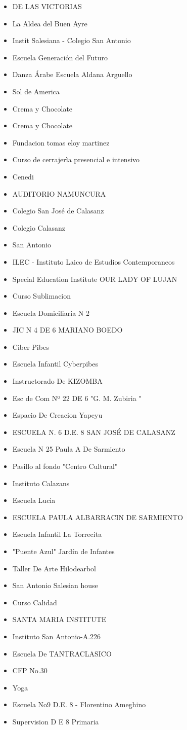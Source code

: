 \documentclass[a4paper, 10pt]{article}
\begin{document}
					\begin{itemize}
					\item DE LAS VICTORIAS
\item La Aldea del Buen Ayre
\item Instit Salesiana - Colegio San Antonio
\item Escuela Generación del Futuro
\item Danza Árabe Escuela Aldana Arguello
\item Sol de America
\item Crema y Chocolate
\item Crema y Chocolate
\item Fundacion tomas eloy martinez
\item Curso de cerrajerìa presencial e intensivo
\item Cenedi
\item AUDITORIO NAMUNCURA
\item Colegio San José de Calasanz
\item Colegio Calasanz
\item San Antonio
\item ILEC - Instituto Laico de Estudios Contemporaneos
\item Special Education Institute OUR LADY OF LUJAN
\item Curso Sublimacion
\item Escuela Domiciliaria N 2
\item JIC N 4 DE 6 MARIANO BOEDO
\item Ciber Pibes
\item Escuela Infantil Cyberpibes
\item Instructorado De KIZOMBA
\item Esc de Com Nº 22 DE 6 "G. M. Zubiria "
\item Espacio De Creacion Yapeyu
\item ESCUELA N. 6 D.E. 8 SAN JOSÉ DE CALASANZ
\item Escuela N 25 Paula A De Sarmiento
\item Pasillo al fondo "Centro Cultural"
\item Instituto Calazans
\item Escuela Lucia
\item ESCUELA PAULA ALBARRACIN DE SARMIENTO
\item Escuela Infantil La Torrecita
\item "Puente Azul" Jardín de Infantes
\item Taller De Arte Hilodearbol
\item San Antonio Salesian house
\item Curso Calidad
\item SANTA MARIA INSTITUTE
\item Instituto San Antonio-A.226
\item Escuela De TANTRACLASICO
\item CFP No.30
\item Yoga
\item Escuela No9 D.E. 8 - Florentino Ameghino
\item Supervision D E 8 Primaria
					\end{itemize}
\end{document}

